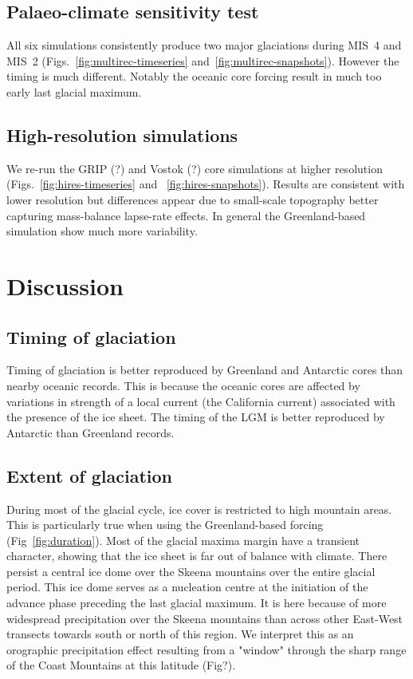 \documentclass[tc, ms]{copernicus}
\begin{document}
\subsection{Palaeo-climate sensitivity test}

All six simulations consistently produce two major glaciations during MIS~4 and
MIS~2 (Figs.~\ref{fig:multirec-timeseries} and~\ref{fig:multirec-snapshots}).
However the timing is much different. Notably the oceanic core forcing result
in much too early last glacial maximum.

\subsection{High-resolution simulations}

We re-run the GRIP (?) and Vostok (?) core simulations at higher resolution
(Figs.~\ref{fig:hires-timeseries} and ~\ref{fig:hires-snapshots}). Results are
consistent with lower resolution but differences appear due to small-scale
topography better capturing mass-balance lapse-rate effects. In general the
Greenland-based simulation show much more variability.

\section{Discussion}
\label{sec:discussion}

\subsection{Timing of glaciation}

Timing of glaciation is better reproduced by Greenland and Antarctic cores than
nearby oceanic records. This is because the oceanic cores are affected by
variations in strength of a local current (the California current) associated
with the presence of the ice sheet. The timing of the LGM is better reproduced
by Antarctic than Greenland records.

\subsection{Extent of glaciation}

During most of the glacial cycle, ice cover is restricted to high mountain
areas. This is particularly true when using the Greenland-based forcing
(Fig~\ref{fig:duration}). Most of the glacial maxima margin have a transient
character, showing that the ice sheet is far out of balance with climate. There
persist a central ice dome over the Skeena mountains over the entire glacial
period. This ice dome serves as a nucleation centre at the initiation of the
advance phase preceding the last glacial maximum. It is here because of more
widespread precipitation over the Skeena mountains than across other East-West
transects towards south or north of this region. We interpret this as an
orographic precipitation effect resulting from a "window" through the sharp
range of the Coast Mountains at this latitude (Fig?).
\end{document}
